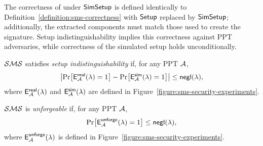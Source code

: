 The correctness of \SMS under $\mathsf{SimSetup}$ is defined identically
to Definition~\ref{definition:sms-correctness} with $\mathsf{Setup}$
replaced by $\mathsf{SimSetup}$;
additionally, the extracted components must match those used to create the signature.
Setup indistinguishability implies this correctness against PPT adversaries,
while correctness of the simulated setup holds unconditionally.

\begin{definition}%
\label{definition:sms-setup-indistinguishability}
$\mathcal{SMS}$ satisfies \emph{setup indistinguishability} if,
for any PPT $\mathcal{A}$,
\[
\left|\Pr\bigl[\mathsf{E}^{\mathsf{real}}_{\mathcal{A}}(\lambda) = 1\bigr]
- \Pr\bigl[\mathsf{E}^{\mathsf{sim}}_{\mathcal{A}}(\lambda) = 1\bigr]\right|
\leq \mathsf{negl}(\lambda),
\]
where $\mathsf{E}^{\mathsf{real}}_{\mathcal{A}}(\lambda)$ and $\mathsf{E}^{\mathsf{sim}}_{\mathcal{A}}(\lambda)$
are defined in Figure~\ref{figure:sms-security-experiments}.
\end{definition}

\begin{definition}[Unforgeability]\label{definition:sms-unforgeability}
$\mathcal{SMS}$ is \emph{unforgeable} if, for any PPT $\mathcal{A}$,
\[
\Pr\bigl[\mathsf{E}^{\mathsf{unforge}}_{\mathcal{A}}(\lambda) = 1\bigr] \leq \mathsf{negl}(\lambda),
\]
where $\mathsf{E}^{\mathsf{unforge}}_{\mathcal{A}}(\lambda)$ is defined in
Figure~\ref{figure:sms-security-experiments}.
\end{definition}
